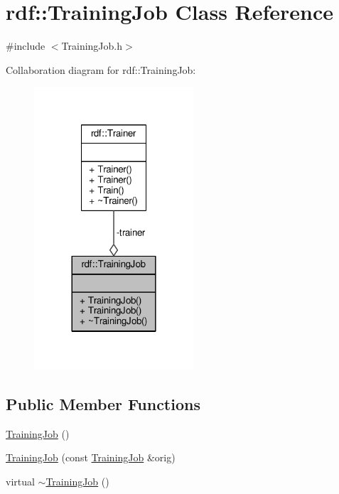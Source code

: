 \hypertarget{classrdf_1_1TrainingJob}{}\section{rdf\+:\+:Training\+Job Class Reference}
\label{classrdf_1_1TrainingJob}


{\ttfamily \#include $<$Training\+Job.\+h$>$}



Collaboration diagram for rdf\+:\+:Training\+Job\+:
\nopagebreak
\begin{figure}[H]
\begin{center}
\leavevmode
\includegraphics[width=168pt]{classrdf_1_1TrainingJob__coll__graph}
\end{center}
\end{figure}
\subsection*{Public Member Functions}
\begin{DoxyCompactItemize}
\item 
\hyperlink{classrdf_1_1TrainingJob_ac858d27e8e685e2051396383116a1adf}{Training\+Job} ()
\item 
\hyperlink{classrdf_1_1TrainingJob_a11dd702b3d34c66149c00667cb41be09}{Training\+Job} (const \hyperlink{classrdf_1_1TrainingJob}{Training\+Job} \&orig)
\item 
virtual \hyperlink{classrdf_1_1TrainingJob_a5ce50bcf9065e0970ca7ea4a2edd85ce}{$\sim$\+Training\+Job} ()
\end{DoxyCompactItemize}
